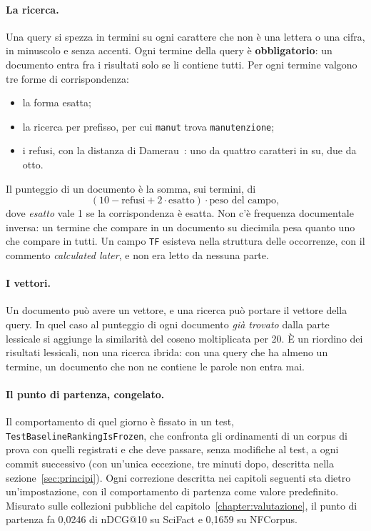 \paragraph{La ricerca.} Una query si spezza in termini su ogni carattere che non
è una lettera o una cifra, in minuscolo e senza accenti. Ogni termine della
query è \textbf{obbligatorio}: un documento entra fra i risultati solo se li
contiene tutti. Per ogni termine valgono tre forme di corrispondenza:
\begin{itemize}
  \item la forma esatta;
  \item la ricerca per prefisso, per cui \texttt{manut} trova
        \texttt{manutenzione};
  \item i refusi, con la distanza di Damerau~\cite{damerau1964}: uno da quattro
        caratteri in su, due da otto.
\end{itemize}
Il punteggio di un documento è la somma, sui termini, di
\[
  (10 - \text{refusi} + 2 \cdot \text{esatto}) \cdot \text{peso del campo},
\]
dove \emph{esatto} vale 1 se la corrispondenza è esatta. Non c'è frequenza
documentale inversa: un termine che compare in un documento su diecimila pesa
quanto uno che compare in tutti. Un campo \texttt{TF} esisteva nella struttura
delle occorrenze, con il commento \emph{calculated later}, e non era letto da
nessuna parte.

\paragraph{I vettori.} Un documento può avere un vettore, e una ricerca può
portare il vettore della query. In quel caso al punteggio di ogni documento
\emph{già trovato} dalla parte lessicale si aggiunge la similarità del coseno
moltiplicata per 20. È un riordino dei risultati lessicali, non una ricerca
ibrida: con una query che ha almeno un termine, un documento che non ne
contiene le parole non entra mai.

\paragraph{Il punto di partenza, congelato.} Il comportamento di quel giorno è
fissato in un test, \texttt{TestBaselineRankingIsFrozen}, che confronta gli
ordinamenti di un corpus di prova con quelli registrati e che deve passare,
senza modifiche al test, a ogni commit successivo (con un'unica eccezione, tre
minuti dopo, descritta nella sezione~\ref{sec:principi}). Ogni correzione descritta
nei capitoli seguenti sta dietro un'impostazione, con il comportamento di
partenza come valore predefinito. Misurato sulle collezioni pubbliche del
capitolo~\ref{chapter:valutazione}, il punto di partenza fa 0,0246 di nDCG@10 su
SciFact e 0,1659 su NFCorpus.

